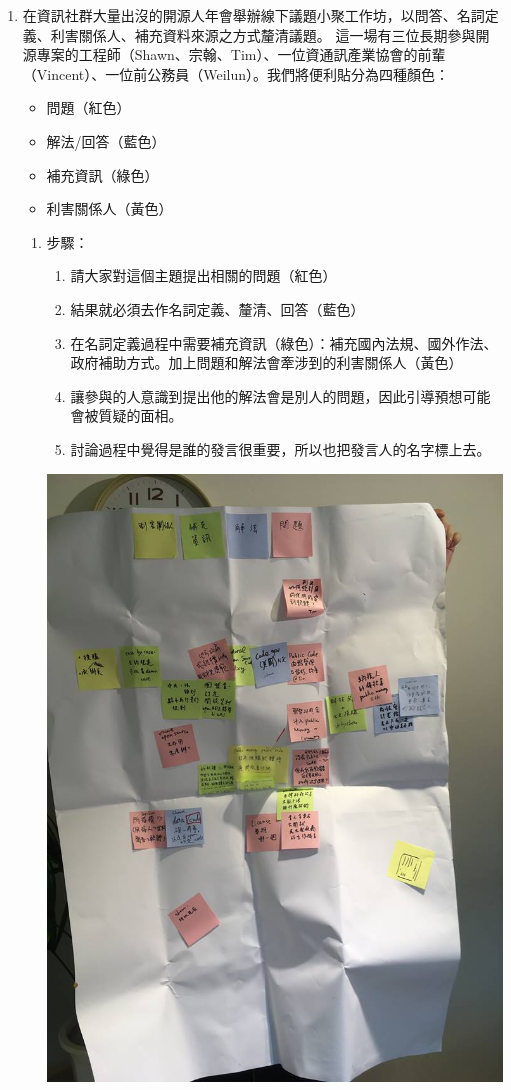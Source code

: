 \documentclass[12pt,a4paper]{article}
\begin{document}
\begin{enumerate}
\begin{enumerate}
\item 在資訊社群大量出沒的開源人年會舉辦線下議題小聚工作坊，以問答、名詞定義、利害關係人、補充資料來源之方式釐清議題。
這一場有三位長期參與開源專案的工程師（Shawn、宗翰、Tim）、一位資通訊產業協會的前輩（Vincent）、一位前公務員（Weilun）。我們將便利貼分為四種顏色：
\begin{itemize}
\item 問題（紅色）
\item 解法/回答（藍色）
\item 補充資訊（綠色）
\item 利害關係人（黃色）
\end{itemize}
\begin{enumerate}
\item 步驟：
\begin{enumerate}
\item 請大家對這個主題提出相關的問題（紅色）
\item 結果就必須去作名詞定義、釐清、回答（藍色）
\item 在名詞定義過程中需要補充資訊（綠色）：補充國內法規、國外作法、政府補助方式。加上問題和解法會牽涉到的利害關係人（黃色）
\item 讓參與的人意識到提出他的解法會是別人的問題，因此引導預想可能會被質疑的面相。
\item 討論過程中覺得是誰的發言很重要，所以也把發言人的名字標上去。
\end{enumerate}
\begin{center}
\includegraphics[width=.9\linewidth]{./images/pmpc.png}

\end{center}
\end{enumerate}
\end{enumerate}
\end{enumerate}
\end{document}
